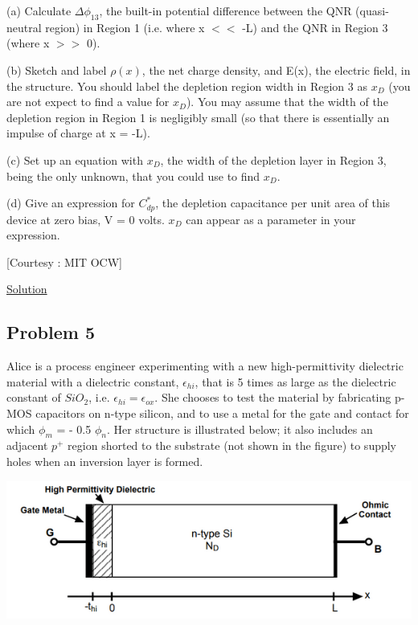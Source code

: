 \documentclass[12 pt]{article}
\begin{document}
(a) Calculate $\Delta\phi_{13}$, the built-in potential difference between the QNR (quasi-neutral region) in Region 1 (i.e. where x $<<$ -L) and the QNR in Region 3 (where x $>>$ 0). \par

(b) Sketch and label $\rho(x)$, the net charge density, and E(x), the electric field, in the structure. You should label the depletion region width in Region 3 as $x_{D}$ (you are not expect to find a value for $x_{D}$). You may assume that the width of the depletion region in Region 1 is negligibly small (so that there is essentially an impulse of charge at x = -L). \par

(c) Set up an equation with $x_{D}$, the width of the depletion layer in Region 3, being the only unknown, that you could use to find $x_{D}$.  \par

(d) Give an expression for $C^{*}_{dp}$, the depletion capacitance per unit area of this device at zero bias, V = 0 volts. $x_{D}$ can appear as a parameter in your expression.  \par

\hspace{12 cm}[Courtesy : MIT OCW]

\href{https://drive.google.com/file/d/1WXVlVUPrEufr3gocBx2el-wyhII5PUq3/view?usp=sharing}{Solution}

\subsection{Problem 5}

Alice is a process engineer experimenting with a new high-permittivity dielectric material with a dielectric constant, $\epsilon_{hi}$, that is 5 times as large as the dielectric constant of $SiO_{2}$, i.e. $\epsilon_{hi} = \epsilon_{ox}$. She chooses to test the material by fabricating p-MOS capacitors on n-type silicon, and to use a metal for the gate and contact for which $\phi_{m}$ = - 0.5 $\phi_{n}$. Her structure is illustrated below; it also includes an adjacent $p^{+}$ region shorted to the substrate (not shown in the figure) to supply holes when an inversion layer is formed.

\par
\begin{center}
    \includegraphics{Problem_5.png}
\end{center}
\par
\end{document}
